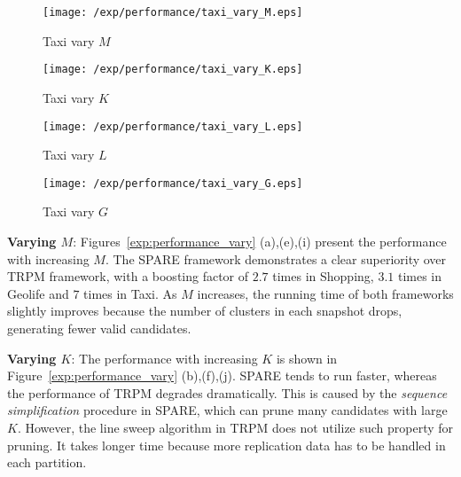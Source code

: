 \begin{figure*}[t]
    \begin{subfigure}[b]{0.23\textwidth}
        \texttt{[image: /exp/performance/taxi\_vary\_M.eps]}
        \caption{Taxi vary $M$}
    \end{subfigure}
    \begin{subfigure}[b]{0.23\textwidth}
        \texttt{[image: /exp/performance/taxi\_vary\_K.eps]}
        \caption{Taxi vary $K$}
    \end{subfigure}
    \begin{subfigure}[b]{0.23\textwidth}
        \texttt{[image: /exp/performance/taxi\_vary\_L.eps]}
        \caption{Taxi vary $L$}
    \end{subfigure}
       \begin{subfigure}[b]{0.23\textwidth}
        \texttt{[image: /exp/performance/taxi\_vary\_G.eps]}
        \caption{Taxi vary $G$}
    \end{subfigure}       
\caption{Performance of SPARE and TRPM on real datasets under different pattern parameters.}
\label{exp:performance_vary}
\end{figure*}
\textbf{Varying $M$}: Figures~\ref{exp:performance_vary} (a),(e),(i)
present the performance with increasing $M$. The SPARE framework demonstrates a clear superiority over TRPM framework, with a boosting factor of  $2.7$ times in Shopping, $3.1$ times in Geolife and
$7$ times in Taxi. As $M$ increases, the running time of both frameworks slightly improves because the number of clusters in each snapshot drops, generating fewer valid candidates.


\textbf{Varying $K$}: The performance with increasing $K$ is shown in Figure~\ref{exp:performance_vary} (b),(f),(j).  SPARE tends to run faster, whereas the performance of TRPM degrades dramatically. This is caused by the \emph{sequence simplification} procedure in SPARE, which can prune many candidates with large $K$. However, the line sweep algorithm in TRPM does not utilize such property for pruning. It takes longer time because more replication data has to be handled in each partition.




